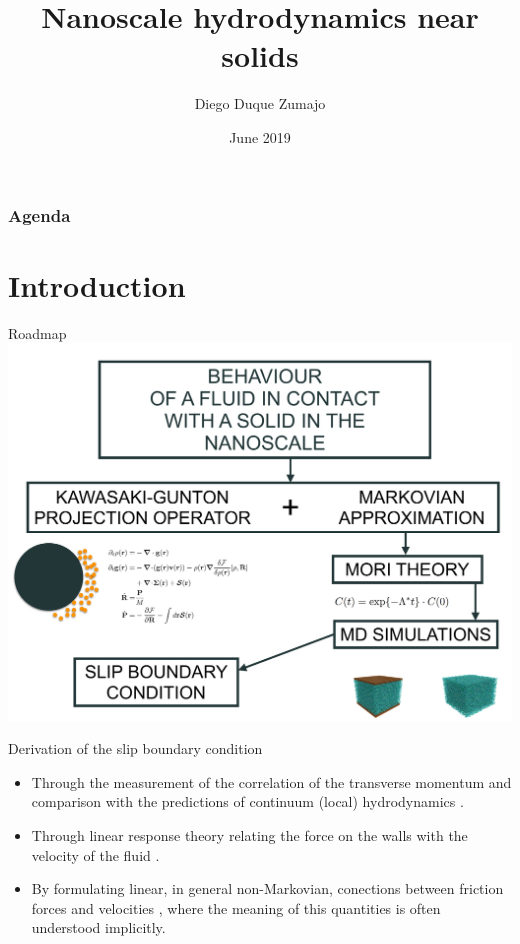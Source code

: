 \documentclass{beamer}
\title{Nanoscale hydrodynamics near solids}
\date{June 2019}
\author{Diego Duque Zumajo}
\institute{Departamento Física Fundamental \\Universidad Nacional de Educación a Distancia}
\begin{document}
\maketitle

\begin{frame}
\frametitle{Agenda}
\tableofcontents
\end{frame}

\section{Introduction}
\begin{frame}{Roadmap}
  \includegraphics[width=\linewidth]{scheme-thesis}
\end{frame}
\begin{frame}{Derivation of the slip boundary condition}
\begin{itemize}
\item Through the  measurement of the correlation of
the  transverse  momentum  and  comparison  with  the  predictions  of
continuum  (local) hydrodynamics  \cite{Bocquet1993,Chen2015}.
\item Through
linear  response theory  relating  the  force on  the  walls with  the
velocity   of  the   fluid   \cite{Bocquet1993,Petravic2007}.
\item By formulating  linear,  in  general  non-Markovian,  conections  between
friction forces and velocities \cite{Hansen2011}, where the meaning of
this quantities is often understood implicitly.
\end{itemize}
\end{frame}
\end{document}
